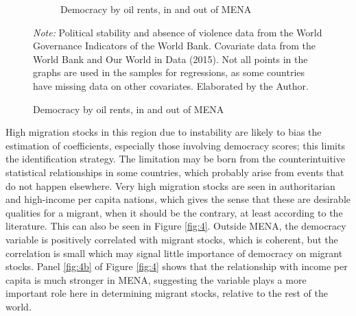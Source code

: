 \documentclass[../main.tex]{subfiles}
\begin{document}
\begin{figure}[H]
{\begin{minipage}{\textwidth}
\begin{subfigure}[b]{0.49\textwidth}
    \caption{Democracy by oil rents, in and out of MENA}
    \label{fig:3b}
    \end{subfigure}
        \textit{Note:} Political stability and absence of violence data from the World Governance Indicators of the World Bank. Covariate data from the World Bank and Our World in Data (2015). Not all points in the graphs are used in the samples for regressions, as some countries have missing data on other covariates. Elaborated by the Author.
    \end{minipage}
    }
\end{figure}

High migration stocks in this region due to instability are likely to bias the estimation of coefficients, especially those involving democracy scores; this limits the identification strategy. The limitation may be born from the counterintuitive statistical relationships in some countries, which probably arise from events that do not happen elsewhere. Very high migration stocks are seen in authoritarian and high-income per capita nations, which gives the sense that these are desirable qualities for a migrant, when it should be the contrary, at least according to the literature. This can also be seen in Figure \ref{fig:4}. Outside MENA, the democracy variable is positively correlated with migrant stocks, which is coherent, but the correlation is small which may signal little importance of democracy on migrant stocks. Panel \ref{fig:4b} of Figure \ref{fig:4} shows that the relationship with income per capita is much stronger in MENA, suggesting the variable plays a more important role here in determining migrant stocks, relative to the rest of the world. 
\end{document}
